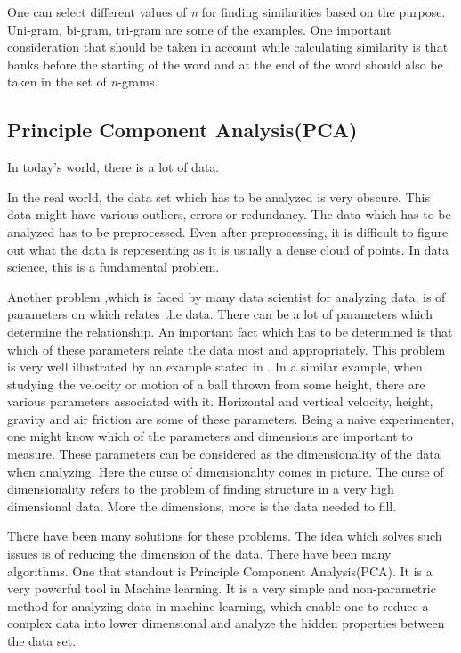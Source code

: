 One can select different values of \textit{n} for finding similarities based on the purpose. Uni-gram, bi-gram, tri-gram are some of the examples. One important consideration  that should be taken in account while calculating similarity is that banks before the starting of the word and at the end of the word should also be taken in the set of \textit{n}-grams. 

\subsection{Principle Component Analysis(PCA)}


In today's world, there is a lot of data. 

In the real world, the data set which has to be analyzed is very obscure. This data might have various outliers, errors or redundancy. The data which has to be analyzed has to be preprocessed. Even after preprocessing, it is difficult to figure out what the data is representing as it is usually a dense cloud of points. In data science, this is a fundamental problem.

Another problem ,which is faced by many data scientist for analyzing data, is of parameters on which relates the data. There can be a lot of parameters which determine the relationship. An important fact which has to be determined is that which of these parameters relate the data most and appropriately. This problem is very well illustrated by an example stated in \cite{shlens2014tutorial}. In a similar example, when studying the velocity or motion of a ball thrown from some height, there are various parameters associated with it. Horizontal and vertical velocity, height, gravity and air friction are some of these parameters. Being a naive experimenter, one might know which of the parameters and dimensions are important to measure. These parameters can be considered as the dimensionality of the data when analyzing. Here the curse of dimensionality comes in picture. The curse of dimensionality refers to the problem of finding structure in a very high dimensional data. More the dimensions, more is the data needed to fill. 

There have been many solutions for these problems. The idea which solves such issues is of reducing the dimension of the data. There have been many algorithms. One that standout is Principle Component Analysis(PCA). It is a very powerful tool in Machine learning. It is a very simple and non-parametric method for analyzing data in machine learning, which enable one to reduce a complex data into lower dimensional and analyze the hidden properties between the data set.

